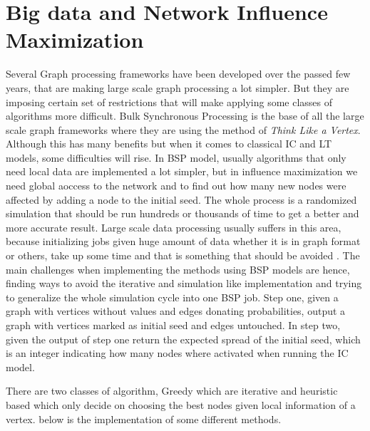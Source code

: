 \documentclass[english]{tktltiki}
\begin{document}
\section{Big data and Network Influence Maximization}
Several Graph processing frameworks have been developed over the passed few years, that are making large scale graph processing a lot simpler. But they are imposing certain set of restrictions that will make applying some classes of algorithms more difficult. Bulk Synchronous Processing is the base of all the large scale graph frameworks where they are using the method of \textit{Think Like a Vertex}. Although this has many benefits but when it comes to classical IC and LT models, some difficulties will rise. In BSP model, usually algorithms that only need local data are implemented a lot simpler, but in influence maximization we need global aoccess to the network and to find out how many new nodes were affected by adding a node to the initial seed. The whole process is a randomized simulation that should be run hundreds or thousands of time to get a better and more accurate result. Large scale data processing usually suffers in this area, because initializing jobs given huge amount of data whether it is in graph format or others, take up some time and that is something that should be avoided . 
The main challenges when implementing the methods using BSP models are hence, finding ways to avoid the iterative and simulation like implementation and trying to generalize the whole simulation cycle into one BSP job.
 Step one, given a graph with vertices without values and edges donating probabilities, output a graph with vertices marked as initial seed and edges untouched. 
In step two, given the output of step one return the expected spread of the initial seed, which is an integer indicating how many nodes where activated when running the IC model.

There are two classes of algorithm, Greedy which are iterative and heuristic based which only decide on choosing the best nodes given local information of a vertex. below is the implementation of some different methods.
\end{document}

